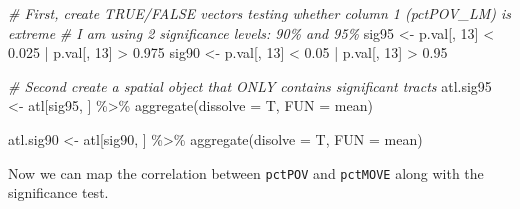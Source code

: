 \documentclass[
]{book}
\newenvironment{Shaded}{\begin{snugshade}}{\end{snugshade}}
\newcommand{\AttributeTok}[1]{\textcolor[rgb]{0.77,0.63,0.00}{#1}}
\newcommand{\CommentTok}[1]{\textcolor[rgb]{0.56,0.35,0.01}{\textit{#1}}}
\newcommand{\DecValTok}[1]{\textcolor[rgb]{0.00,0.00,0.81}{#1}}
\newcommand{\FloatTok}[1]{\textcolor[rgb]{0.00,0.00,0.81}{#1}}
\newcommand{\FunctionTok}[1]{\textcolor[rgb]{0.00,0.00,0.00}{#1}}
\newcommand{\NormalTok}[1]{#1}
\newcommand{\OtherTok}[1]{\textcolor[rgb]{0.56,0.35,0.01}{#1}}
\newcommand{\SpecialCharTok}[1]{\textcolor[rgb]{0.00,0.00,0.00}{#1}}
\begin{document}
\begin{Shaded}
\begin{Highlighting}[]
\CommentTok{\# First, create TRUE/FALSE vectors testing whether column 1 (pctPOV\_LM) is extreme}
\CommentTok{\# I am using 2 significance levels: 90\% and 95\%}
\NormalTok{sig95 }\OtherTok{\textless{}{-}}\NormalTok{ p.val[, }\DecValTok{13}\NormalTok{] }\SpecialCharTok{\textless{}} \FloatTok{0.025} \SpecialCharTok{|}\NormalTok{ p.val[, }\DecValTok{13}\NormalTok{] }\SpecialCharTok{\textgreater{}} \FloatTok{0.975}
\NormalTok{sig90 }\OtherTok{\textless{}{-}}\NormalTok{ p.val[, }\DecValTok{13}\NormalTok{] }\SpecialCharTok{\textless{}} \FloatTok{0.05} \SpecialCharTok{|}\NormalTok{ p.val[, }\DecValTok{13}\NormalTok{] }\SpecialCharTok{\textgreater{}} \FloatTok{0.95}

\CommentTok{\# Second create a spatial object that ONLY contains significant tracts}
\NormalTok{atl.sig95 }\OtherTok{\textless{}{-}}\NormalTok{ atl[sig95, ] }\SpecialCharTok{\%\textgreater{}\%} 
  \FunctionTok{aggregate}\NormalTok{(}\AttributeTok{dissolve =}\NormalTok{ T, }\AttributeTok{FUN =}\NormalTok{ mean) }

\NormalTok{atl.sig90 }\OtherTok{\textless{}{-}}\NormalTok{ atl[sig90, ] }\SpecialCharTok{\%\textgreater{}\%}
  \FunctionTok{aggregate}\NormalTok{(}\AttributeTok{disolve =}\NormalTok{ T, }\AttributeTok{FUN =}\NormalTok{ mean)}
\end{Highlighting}
\end{Shaded}

Now we can map the correlation between \texttt{pctPOV} and \texttt{pctMOVE} along with the significance test.
\end{document}
